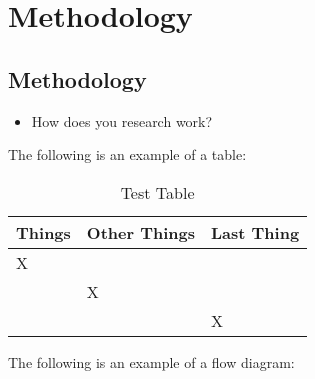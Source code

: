 
\glsresetall %
\chapter[Methodology]{Methodology}\label{ch:Methodology}

\section{Methodology}
\begin{itemize}
	\item{How does you research work?}
\end{itemize}


The following is an example of a table:

\begin{table}[!htbp]
	\centering
	\begin{tabular}{|l|l|l|} %
		\hline
		Things & Other Things & Last Thing \\
		\hline
		X & ~ & ~ \\
		\hline
		~ & X & ~ \\
		\hline
		~ & ~ & X \\
		\hline
	\end{tabular}
	\caption{Test Table}
	\label{tab.testTable}
\end{table}

\clearpage

The following is an example of a flow diagram:  

